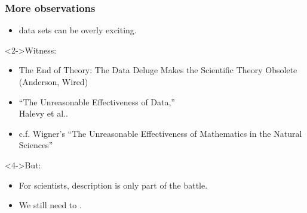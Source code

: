 \begin{frame}
  \frametitle{More observations}

  \begin{block}{}
    \begin{itemize}
    \item<1->
       data sets can be overly \alert{exciting}.
    \end{itemize}
  \end{block}
  
  \begin{block}<2->{Witness:}
    \begin{itemize}
    \item<2->
      The End of Theory: The Data Deluge Makes the Scientific Theory Obsolete (Anderson, Wired)
    \item<3->
      ``The Unreasonable Effectiveness of Data,''\\ Halevy et al.\cite{halevy2009a}.
    \item<3->
      c.f. Wigner's ``The Unreasonable Effectiveness of Mathematics in the Natural Sciences''\cite{wigner1960a}
    \end{itemize}
  \end{block}

  \begin{block}<4->{But:}
  \begin{itemize}
  \item<4-> 
    For scientists, description is only part of the battle.
  \item<5-> 
    We still need to .
  \end{itemize}
  \end{block}

\end{frame}



